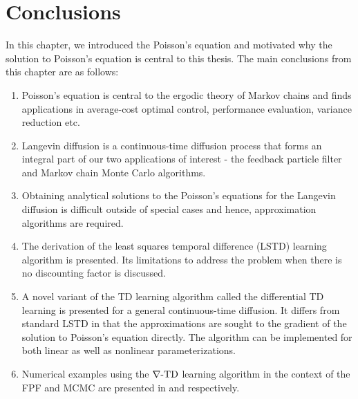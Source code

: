 \section{Conclusions}
In this chapter, we introduced the Poisson's equation and motivated why the solution to Poisson's equation is central to this thesis. The main conclusions from this chapter are as follows:
\begin{enumerate}
	\item Poisson's equation is central to the ergodic theory of Markov chains and finds applications in average-cost optimal control, performance evaluation, variance reduction etc. 
	\item Langevin diffusion is a continuous-time diffusion process that forms an integral part of our two applications of interest - the feedback particle filter and Markov chain Monte Carlo algorithms. 
	\item Obtaining analytical solutions to the Poisson's equations for the Langevin diffusion is difficult outside of special cases and hence, approximation algorithms are required. 
	\item The derivation of the least squares temporal difference (LSTD) learning algorithm is presented. Its limitations to address the problem when there is no discounting factor is discussed. 
	\item A novel variant of the TD learning algorithm called the differential TD learning is presented for a general continuous-time diffusion. It differs from standard LSTD in that the approximations are sought to the gradient of the solution to Poisson's equation directly. The algorithm can be implemented for both linear as well as nonlinear parameterizations. 
	\item Numerical examples using the $\nabla\text{-TD}$ learning algorithm in the context of the FPF and MCMC are presented in  and  respectively. 

\end{enumerate}




